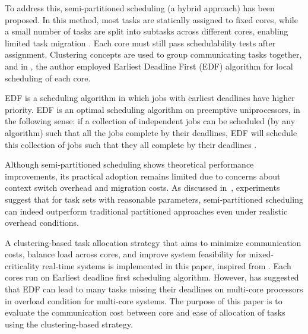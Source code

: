 \documentclass[conference]{IEEEtran}
\begin{document}
To address this, semi-partitioned scheduling (a hybrid approach) has been proposed. In this method, most tasks are statically assigned to fixed cores, while a small number of tasks are split into subtasks across different cores, enabling limited task migration \cite{AbdallahGB24}. Each core must still pass schedulability tests after assignment. Clustering concepts are used to group communicating tasks together, and in \cite{AbdallahGB24}, the author employed Earliest Deadline First (EDF) algorithm for local scheduling of each core.

EDF is
a scheduling algorithm in which jobs with earliest deadlines have higher
priority. EDF is an optimal scheduling algorithm on preemptive uniprocessors, in the following sense: if a collection of
independent jobs can be scheduled (by any algorithm) such
that all the jobs complete by their deadlines, EDF will schedule
this collection of jobs such that they all complete by their
deadlines \cite{6122386}.

Although semi-partitioned scheduling shows theoretical performance improvements, its practical adoption remains limited due to concerns about context switch overhead and migration costs. As discussed in~\cite{5953668}, experiments suggest that for task sets with reasonable parameters, semi-partitioned scheduling can indeed outperform traditional partitioned approaches even under realistic overhead conditions.


A clustering-based task allocation strategy that aims to minimize communication costs, balance load across cores, and improve system feasibility for mixed-criticality real-time systems is implemented in this paper, inspired from \cite{AbdallahGB24}. Each cores run on Earliest deadline first scheduling algorithm. However, \cite{5194980} has suggested that EDF can lead to many tasks missing their deadlines on multi-core processors in
overload condition for multi-core systems. The purpose of this paper is to evaluate the communication cost between core and ease of allocation of tasks using the clustering-based strategy. 
\end{document}
